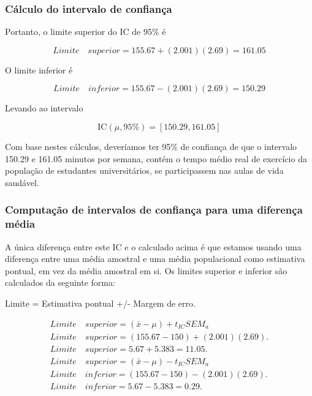 \documentclass[11pt]{beamer}
\begin{document}
\begin{frame}
\frametitle{Cálculo do intervalo de confiança}

Portanto, o limite superior do IC de 95\% é

\[Limite\quad superior = 155.67 + (2.001)(2.69) = 161.05\]

O limite inferior é

\[Limite\quad inferior = 155.67 - (2.001)(2.69) = 150.29\]

Levando ao intervalo

\[\text{IC}(\mu, 95\%) = [150.29, 161.05]\]

Com base nestes cálculos, deveríamos ter 95\% de confiança de que o intervalo 150.29 e 161.05 minutos por semana, contém o tempo médio real de exercício da população de estudantes universitários, se participassem nas aulas de vida saudável.
\end{frame}

\begin{frame}
\frametitle{Computação de intervalos de confiança para uma diferença média}

A única diferença entre este IC e o calculado acima é que estamos usando uma diferença entre uma média amostral e uma média populacional como estimativa pontual, em vez da média amostral em si. Os limites superior e inferior são calculados da seguinte forma:

Limite = Estimativa pontual +/- Margem de erro.

\begin{align*}
Limite\quad superior = (\bar{x}-\mu) + t_{IC}SEM_a\\ 
Limite\quad superior = (155.67 - 150) + (2.001)(2.69).\\
Limite\quad superior = 5.67+5.383 = 11.05.\\
Limite\quad superior = (\bar{x}-\mu) - t_{IC}SEM_a\\
Limite\quad inferior = (155.67 - 150) - (2.001)(2.69).\\
Limite\quad inferior = 5.67-5.383 = 0.29.\\
\end{align*}

\end{frame}
\end{document}
